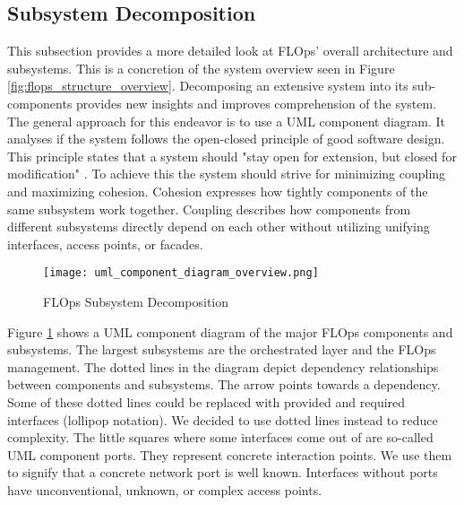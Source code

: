 \subsection{Subsystem Decomposition} \label{subsection:subsystem_decomposition}

This subsection provides a more detailed look at FLOps' overall architecture and subsystems.
This is a concretion of the system overview seen in Figure \ref{fig:flops_structure_overview}.
Decomposing an extensive system into its sub-components provides new insights and improves comprehension of the system.
The general approach for this endeavor is to use a UML component diagram.
It analyses if the system follows the open-closed principle of good software design.
This principle states that a system should "stay open for extension, but closed for modification" \cite{book:bruegge}.
To achieve this the system should strive for minimizing coupling and maximizing cohesion.
Cohesion expresses how tightly components of the same subsystem work together.
Coupling describes how components from different subsystems directly depend on each other without utilizing unifying interfaces, access points, or facades.

\begin{figure}[p]
    \begin{adjustwidth}{-0.175\paperwidth}{-0.175\paperwidth}
        \centering
        \texttt{[image: uml\_component\_diagram\_overview.png]}
        \caption{FLOps Subsystem Decomposition}
        \label{fig:component_diagram_overview}
    \end{adjustwidth}
\end{figure}

Figure \ref{fig:component_diagram_overview} shows a UML component diagram of the major FLOps components and subsystems.
The largest subsystems are the orchestrated layer and the FLOps management.
The dotted lines in the diagram depict dependency relationships between components and subsystems.
The arrow points towards a dependency.
Some of these dotted lines could be replaced with provided and required interfaces (lollipop notation).
We decided to use dotted lines instead to reduce complexity.
The little squares where some interfaces come out of are so-called UML component ports.
They represent concrete interaction points.
We use them to signify that a concrete network port is well known.
Interfaces without ports have unconventional, unknown, or complex access points.

